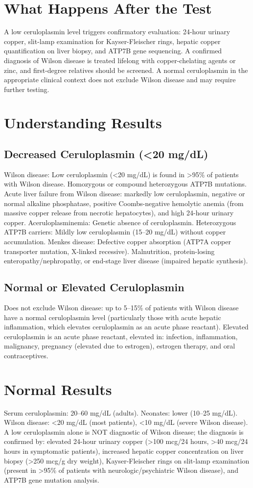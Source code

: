 \section*{What Happens After the Test}
A low ceruloplasmin level triggers confirmatory evaluation: 24-hour urinary copper, slit-lamp examination for Kayser-Fleischer rings, hepatic copper quantification on liver biopsy, and ATP7B gene sequencing. A confirmed diagnosis of Wilson disease is treated lifelong with copper-chelating agents or zinc, and first-degree relatives should be screened. A normal ceruloplasmin in the appropriate clinical context does not exclude Wilson disease and may require further testing.
\section*{Understanding Results}
\subsection*{Decreased Ceruloplasmin (<20 mg/dL)}
Wilson disease: Low ceruloplasmin (<20 mg/dL) is found in >95\% of patients with Wilson disease. Homozygous or compound heterozygous ATP7B mutations. Acute liver failure from Wilson disease: markedly low ceruloplasmin, negative or normal alkaline phosphatase, positive Coombs-negative hemolytic anemia (from massive copper release from necrotic hepatocytes), and high 24-hour urinary copper. Aceruloplasminemia: Genetic absence of ceruloplasmin. Heterozygous ATP7B carriers: Mildly low ceruloplasmin (15--20 mg/dL) without copper accumulation. Menkes disease: Defective copper absorption (ATP7A copper transporter mutation, X-linked recessive). Malnutrition, protein-losing enteropathy/nephropathy, or end-stage liver disease (impaired hepatic synthesis).
\subsection*{Normal or Elevated Ceruloplasmin}
Does not exclude Wilson disease: up to 5--15\% of patients with Wilson disease have a normal ceruloplasmin level (particularly those with acute hepatic inflammation, which elevates ceruloplasmin as an acute phase reactant). Elevated ceruloplasmin is an acute phase reactant, elevated in: infection, inflammation, malignancy, pregnancy (elevated due to estrogen), estrogen therapy, and oral contraceptives.
\section*{Normal Results}
Serum ceruloplasmin: 20--60 mg/dL (adults). Neonates: lower (10--25 mg/dL). Wilson disease: <20 mg/dL (most patients), <10 mg/dL (severe Wilson disease). A low ceruloplasmin alone is NOT diagnostic of Wilson disease; the diagnosis is confirmed by: elevated 24-hour urinary copper (>100 mcg/24 hours, >40 mcg/24 hours in symptomatic patients), increased hepatic copper concentration on liver biopsy (>250 mcg/g dry weight), Kayser-Fleischer rings on slit-lamp examination (present in >95\% of patients with neurologic/psychiatric Wilson disease), and ATP7B gene mutation analysis.
